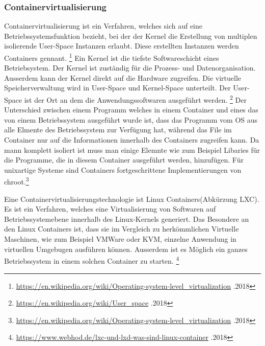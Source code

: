 \documentclass[10pt]{article}
\begin{document}
	\subsubsection{Containervirtualisierung}
	Containervirtualisierung ist ein Verfahren, welches sich auf eine Betriebssystemsfunktion bezieht, bei der der Kernel die Erstellung von multiplen isolierende User-Space Instanzen erlaubt. Diese erstellten Instanzen werden Containers gennant. \footnote{\label{foot:4} \href{https://en.wikipedia.org/wiki/Operating-system-level_virtualization}{https://en.wikipedia.org/wiki/Operating-system-level_virtualization} .2018} 
Ein Kernel ist die tiefste Softwareschicht eines Betriebsystem. Der Kernel ist zuständig für die Prozess- und Datenorganisation. Ausserdem kann der Kernel direkt auf die Hardware zugreifen.
Die virtuelle Speicherverwaltung wird in User-Space und Kernel-Space unterteilt. Der User-Space ist der Ort an dem die  Anwendungssoftwaren ausgeführt werden. \footnote{\label{foot:6} \href{https://en.wikipedia.org/wiki/User_space}{https://en.wikipedia.org/wiki/User_space} .2018} 
Der Unterschied zwischen einem Programm welches in einem Container und eines das von einem Betriebssystem ausgeführt wurde ist, dass das Programm vom OS aus alle Elmente des Betriebssystem zur Verfügung hat, während das File im Container nur auf die Informationen innerhalb des Containers zugreifen kann. Da mann komplett isoliert ist muss man einige Elemnte wie zum Beispiel Libaries für die Programme, die in diesem Container ausgeführt werden, hinzufügen. 
Für unixartige Systeme sind Containers fortgeschrittene Implementierungen von chroot.\footnote{\label{foot:4} \href{https://en.wikipedia.org/wiki/Operating-system-level_virtualization}{https://en.wikipedia.org/wiki/Operating-system-level_virtualization} .2018} 
	
	Eine Containervirtualisierungstechnologie ist Linux Containers(Abkürzung LXC). Es ist ein Verfahren, welches eine Virtualisierung von Softwaren auf Betriebssystemebene innerhalb des Linux-Kernels generiert. 
Das Besondere an den Linux Containers ist, dass sie im Vergleich zu herkömmlichen Virtuelle Maschinen, wie zum Beispiel VMWare oder KVM, einzelne Anwendung in virtuellen Umgebugen ausführen können. Ausserdem ist es Möglich ein ganzes Betriebssystem in einem solchen Container zu starten.  \footnote{\label{foot:5} \href{https://www.webhod.de/lxc-und-lxd-was-sind-linux-container}{https://www.webhod.de/lxc-und-lxd-was-sind-linux-container} .2018}  
\end{document}
